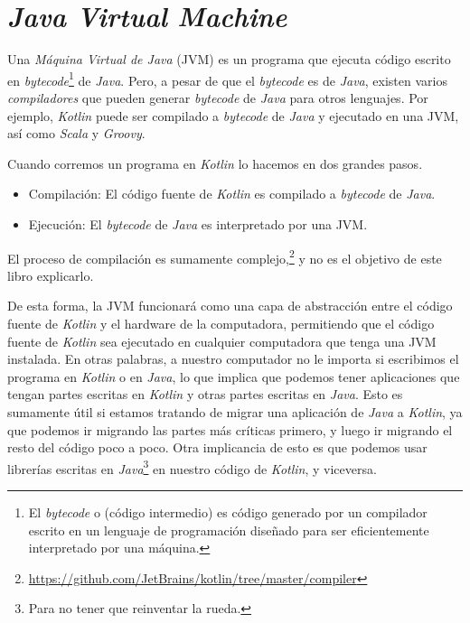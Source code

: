 \section{\textit{Java Virtual Machine}}
  Una \textit{Máquina Virtual de Java} (JVM) es un programa que ejecuta código escrito en 
  \textit{bytecode}\footnote{
    El \textit{bytecode} o (código intermedio) es código generado por un compilador escrito en un 
    lenguaje de programación diseñado para ser eficientemente interpretado por una máquina.
  } de \textit{Java}.
  Pero, a pesar de que el \textit{bytecode} es de \textit{Java}, existen varios 
  \textit{compiladores} que pueden generar \textit{bytecode} de \textit{Java} para otros lenguajes.
  Por ejemplo, \textit{Kotlin} puede ser compilado a \textit{bytecode} de \textit{Java} y ejecutado
  en una JVM, así como \textit{Scala} y \textit{Groovy}.

  Cuando corremos un programa en \textit{Kotlin} lo hacemos en dos grandes pasos.
  \begin{itemize}
    \item Compilación: El código fuente de \textit{Kotlin} es compilado a \textit{bytecode} de
      \textit{Java}.
    \item Ejecución: El \textit{bytecode} de \textit{Java} es interpretado por una JVM.
  \end{itemize}

  \begin{note}
    El proceso de compilación es sumamente complejo,\footnote{
      \url{https://github.com/JetBrains/kotlin/tree/master/compiler}
    } y no es el objetivo de este libro explicarlo.
  \end{note}

  De esta forma, la JVM funcionará como una capa de abstracción entre el código fuente de
  \textit{Kotlin} y el hardware de la computadora, permitiendo que el código fuente de 
  \textit{Kotlin} sea ejecutado en cualquier computadora que tenga una JVM instalada.
  En otras palabras, a nuestro computador no le importa si escribimos el programa en \textit{Kotlin}
  o en \textit{Java}, lo que implica que podemos tener aplicaciones que tengan partes escritas en
  \textit{Kotlin} y otras partes escritas en \textit{Java}.
  Esto es sumamente útil si estamos tratando de migrar una aplicación de \textit{Java} a
  \textit{Kotlin}, ya que podemos ir migrando las partes más críticas primero, y luego ir
  migrando el resto del código poco a poco.
  Otra implicancia de esto es que podemos usar librerías escritas en \textit{Java}\footnote{
    Para no tener que reinventar la rueda.
  } en nuestro código de \textit{Kotlin}, y viceversa.

